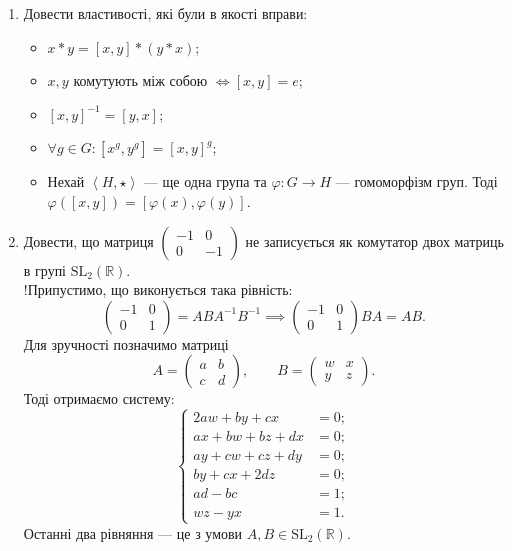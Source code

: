 \documentclass{math_library}
\begin{document}
\begin{enumerate}[wide=0pt,label=\thesubsection.\arabic*]
\item Довести властивості, які були в якості вправи:
\begin{itemize}
\item $x*y = [x,y]*(y*x)$;
\item $x,y$ комутують між собою $\iff [x,y] = e$;
\item $[x,y]^{-1} = [y,x]$;
\item $\forall g \in G: [x^g,y^g] = [x,y]^g$;
\item Нехай $\left< H,\star\right>$ --- ще одна група та $\varphi \colon G \to H$ --- гомоморфізм груп. Тоді $\varphi([x,y]) = [\varphi(x),\varphi(y)]$.
\end{itemize}

\item Довести, що матриця $\begin{pmatrix}
-1 & 0 \\
0 & -1
\end{pmatrix}$ не записується як комутатор двох матриць в групі $\mathrm{SL}_2(\mathbb{R})$.
\bigskip \\
!Припустимо, що виконується така рівність:
\[
\begin{pmatrix}
-1 & 0 \\
0 & 1
\end{pmatrix} = ABA^{-1}B^{-1} \implies \begin{pmatrix}
-1 & 0 \\
0 & 1
\end{pmatrix} BA = AB.
\]
Для зручності позначимо матриці
\[
A = \begin{pmatrix}
a & b \\
c & d
\end{pmatrix}, \qquad B = \begin{pmatrix}
w & x \\
y & z
\end{pmatrix}.
\]
Тоді отримаємо систему:
\[
\begin{cases} 
2aw + by + cx & = 0; \\
ax + bw + bz + dx & = 0; \\
ay + cw + cz + dy & = 0; \\
by + cx + 2dz & = 0; \\
ad - bc & = 1; \\
wz - yx & = 1.
\end{cases}
\]
Останні два рівняння --- це з умови $A,B \in \mathrm{SL}_2(\mathbb{R})$.\\

\end{enumerate}
\end{document}

